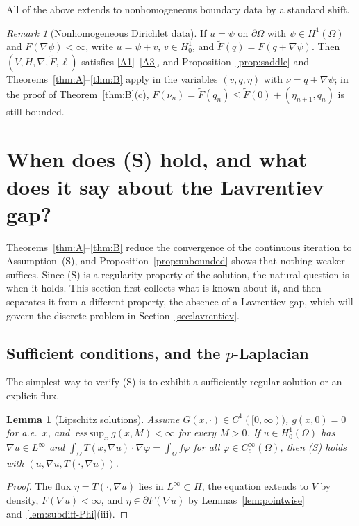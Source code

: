 \documentclass[11pt]{amsart}
\newtheorem{lemma}[theorem]{Lemma}
\theoremstyle{definition}
\theoremstyle{remark}
\newtheorem{remark}[theorem]{Remark}
\numberwithin{equation}{section}
\DeclareMathOperator*{\esssup}{ess\,sup}
\begin{document}
All of the above extends to nonhomogeneous boundary data by a standard shift.

\begin{remark}[Nonhomogeneous Dirichlet data]\label{rem:dirichlet-cont}
If $u=\psi$ on $\partial\Omega$ with $\psi\in H^1(\Omega)$ and $F(\nabla\psi)<\infty$, write $u=\psi+v$, $v\in H^1_0$, and $\tilde F(q)=F(q+\nabla\psi)$. Then $(V,H,\nabla,\tilde F,\ell)$ satisfies \ref{A1}--\ref{A3}, and Proposition~\ref{prop:saddle} and Theorems~\ref{thm:A}--\ref{thm:B} apply in the variables $(v,q,\eta)$ with $\nu=q+\nabla\psi$; in the proof of Theorem~\ref{thm:B}(c), $F(\nu_n)=\tilde F(q_n)\le\tilde F(0)+(\eta_{n+1},q_n)$ is still bounded.
\end{remark}

\section{When does (S) hold, and what does it say about the Lavrentiev gap?}\label{sec:S}

Theorems~\ref{thm:A}--\ref{thm:B} reduce the convergence of the continuous iteration to Assumption~(S), and Proposition~\ref{prop:unbounded} shows that nothing weaker suffices. Since (S) is a regularity property of the solution, the natural question is when it holds. This section first collects what is known about it, and then separates it from a different property, the absence of a Lavrentiev gap, which will govern the discrete problem in Section~\ref{sec:lavrentiev}.

\subsection{Sufficient conditions, and the \texorpdfstring{$p$}{p}-Laplacian}\label{ssec:S-p}
The simplest way to verify (S) is to exhibit a sufficiently regular solution or an explicit flux.
\begin{lemma}[Lipschitz solutions]\label{lem:lipschitz}
Assume $G(x,\cdot)\in C^1([0,\infty))$, $g(x,0)=0$ for a.e.\ $x$, and $\esssup_xg(x,M)<\infty$ for every $M>0$. If $u\in H^1_0(\Omega)$ has $\nabla u\in L^\infty$ and $\int_\Omega T(x,\nabla u)\cdot\nabla\varphi=\int_\Omega f\varphi$ for all $\varphi\in C^\infty_c(\Omega)$, then \textup{(S)} holds with $(u,\nabla u,T(\cdot,\nabla u))$.
\end{lemma}
\begin{proof}
The flux $\eta=T(\cdot,\nabla u)$ lies in $L^\infty\subset H$, the equation extends to $V$ by density, $F(\nabla u)<\infty$, and $\eta\in\partial F(\nabla u)$ by Lemmas~\ref{lem:pointwise} and~\ref{lem:subdiff-Phi}(iii).
\end{proof}
\end{document}
